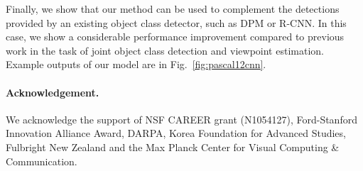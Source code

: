 \documentclass[extendedabs]{bmvc2k}
\begin{document}
Finally, we show that our method can be used to complement the
detections provided by an existing object class detector, such
as DPM or R-CNN. In this case, we show a considerable performance improvement
compared to previous work in the task of joint object class detection and viewpoint
estimation. Example outputs of our model are in Fig.~\ref{fig:pascal12cnn}.

\vspace{-0.1in}
\paragraph{Acknowledgement.} We acknowledge the support of NSF CAREER grant
(N1054127), Ford-Stanford Innovation Alliance Award, DARPA, Korea Foundation
for Advanced Studies, Fulbright New Zealand and the Max Planck Center for Visual Computing \&
Communication.


\end{document}

